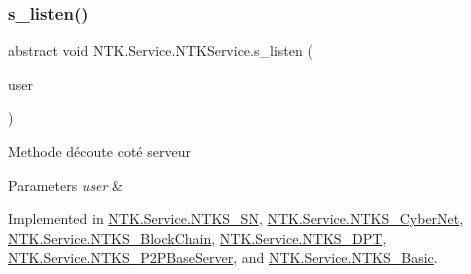 \mbox{\label{class_n_t_k_1_1_service_1_1_n_t_k_service_a7c7cb8c5ddc57bebe6d9784744c976d7}} 
\subsubsection{\texorpdfstring{s\_listen()}{s\_listen()}}
{\footnotesize\ttfamily abstract void N\+T\+K.\+Service.\+N\+T\+K\+Service.\+s\+\_\+listen (\begin{DoxyParamCaption}\item[{\mbox{\hyperlink{class_n_t_k_1_1_n_t_k_user}{N\+T\+K\+User}}}]{user }\end{DoxyParamCaption})\hspace{0.3cm}{\ttfamily [pure virtual]}}



Methode d\textquotesingle{}écoute coté serveur 


\begin{DoxyParams}{Parameters}
{\em user} & \\
\hline
\end{DoxyParams}


Implemented in \mbox{\hyperlink{class_n_t_k_1_1_service_1_1_n_t_k_s___s_n_a4fd6ae452b8b494efe62d966eb8d23c8}{N\+T\+K.\+Service.\+N\+T\+K\+S\+\_\+\+SN}}, \mbox{\hyperlink{class_n_t_k_1_1_service_1_1_n_t_k_s___cyber_net_a1584c291a5292d44e3076eaf3c3c1c67}{N\+T\+K.\+Service.\+N\+T\+K\+S\+\_\+\+Cyber\+Net}}, \mbox{\hyperlink{class_n_t_k_1_1_service_1_1_n_t_k_s___block_chain_a5904f46c7cd3d4bd0b229c5cf9b4811d}{N\+T\+K.\+Service.\+N\+T\+K\+S\+\_\+\+Block\+Chain}}, \mbox{\hyperlink{class_n_t_k_1_1_service_1_1_n_t_k_s___d_p_t_a6472459b1a28f1d257e61242bc812639}{N\+T\+K.\+Service.\+N\+T\+K\+S\+\_\+\+D\+PT}}, \mbox{\hyperlink{class_n_t_k_1_1_service_1_1_n_t_k_s___p2_p_base_server_a29d92f2728d0f824d443114a9b3715ba}{N\+T\+K.\+Service.\+N\+T\+K\+S\+\_\+\+P2\+P\+Base\+Server}}, and \mbox{\hyperlink{class_n_t_k_1_1_service_1_1_n_t_k_s___basic_a1d14f67d95eb73bc1966db7b4d84dc4b}{N\+T\+K.\+Service.\+N\+T\+K\+S\+\_\+\+Basic}}.

\mbox{\label{class_n_t_k_1_1_service_1_1_n_t_k_service_ad8183abf2427e9f870547966179299de}} 
